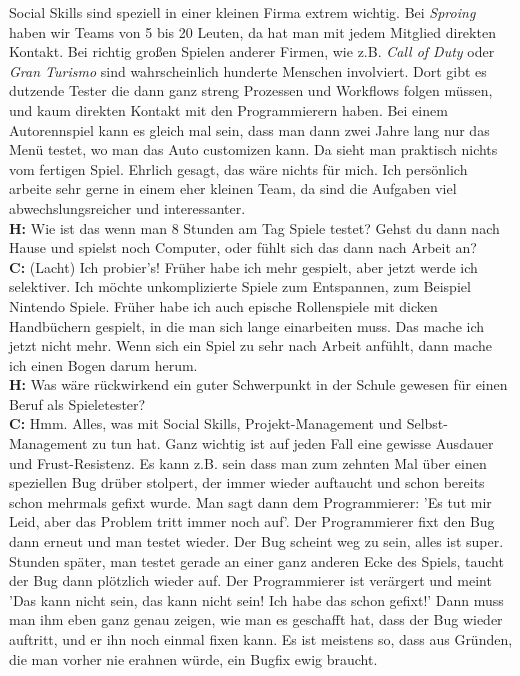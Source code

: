 Social Skills sind speziell in einer kleinen Firma extrem wichtig. Bei \textit{Sproing} haben wir Teams von 5 bis 20 Leuten, da hat man mit jedem Mitglied direkten Kontakt. Bei richtig großen Spielen anderer Firmen, wie z.B. \textit{Call of Duty} oder \textit{Gran Turismo} sind wahrscheinlich hunderte Menschen involviert. Dort gibt es dutzende Tester die dann ganz streng Prozessen und Workflows folgen müssen, und kaum direkten Kontakt mit den Programmierern haben. Bei einem  Autorennspiel kann es gleich mal sein, dass  man dann zwei Jahre lang nur das Menü testet, wo man das Auto customizen kann. Da sieht man praktisch nichts vom fertigen Spiel. Ehrlich gesagt, das wäre nichts für mich. Ich persönlich arbeite sehr gerne in einem eher kleinen Team, da sind die Aufgaben viel abwechslungsreicher und interessanter. \\
\textbf{H:} Wie ist das wenn man 8 Stunden am Tag Spiele testet? Gehst du dann nach Hause und spielst noch Computer, oder fühlt sich das dann nach Arbeit an? \\
\textbf{C:} (Lacht) Ich probier's! Früher habe ich mehr gespielt, aber jetzt werde ich selektiver. Ich möchte unkomplizierte Spiele zum Entspannen, zum Beispiel Nintendo Spiele. Früher habe ich auch epische Rollenspiele mit dicken Handbüchern gespielt, in die man sich lange einarbeiten muss. Das mache ich jetzt nicht mehr. Wenn sich ein Spiel zu sehr nach Arbeit anfühlt, dann mache ich einen Bogen darum herum. \\
\textbf{H:} Was wäre rückwirkend ein guter Schwerpunkt in der Schule gewesen für einen Beruf als Spieletester? \\
\textbf{C:} Hmm. Alles, was mit Social Skills, Projekt-Management und Selbst-Management zu tun hat. Ganz wichtig ist auf jeden Fall eine gewisse Ausdauer und Frust-Resistenz. Es kann z.B. sein dass man zum zehnten Mal über einen speziellen Bug drüber stolpert, der immer wieder auftaucht und schon bereits schon mehrmals gefixt wurde. Man sagt dann dem Programmierer: 'Es tut mir Leid, aber das Problem tritt immer noch auf'. Der Programmierer fixt den Bug dann erneut und man testet wieder. Der Bug scheint weg zu sein, alles ist super. Stunden später, man testet gerade an einer ganz anderen Ecke des Spiels, taucht der Bug dann plötzlich wieder auf. Der Programmierer ist verärgert und meint 'Das kann nicht sein, das kann nicht sein! Ich habe das schon gefixt!' Dann muss man ihm eben ganz genau zeigen, wie man es geschafft hat, dass der Bug wieder auftritt, und er ihn noch einmal fixen kann. Es ist meistens so, dass aus Gründen, die man vorher nie erahnen würde, ein Bugfix ewig braucht. \\
